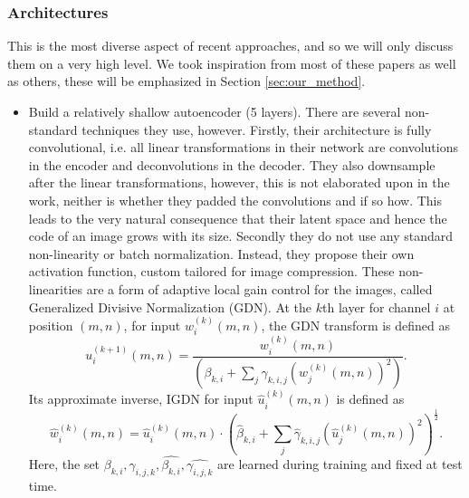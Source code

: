 \documentclass{article}
\begin{document}
\subsubsection{Architectures}
\par
This is the most diverse aspect of recent approaches, and so we will only
discuss them on a very high level. We took inspiration from most of these papers
as well as others, these will be emphasized in Section \ref{sec:our_method}.

\begin{itemize}
\item \cite{balle2016end} Build a relatively shallow autoencoder (5 layers).
  There are several non-standard techniques they use, however. Firstly, their
  architecture is fully convolutional, i.e. all linear transformations in their
  network are convolutions in the encoder and deconvolutions in the decoder.
  They also downsample after the linear transformations, however, this is not
  elaborated upon in the work, neither is whether they padded the convolutions
  and if so how.
  This leads to the very natural consequence that their latent space and hence
  the code of an image grows with its size. Secondly they do not use any
  standard non-linearity or batch normalization. Instead, they propose their own
  activation function, custom tailored for image compression. These
  non-linearities are a form of adaptive local gain control for the images,
  called Generalized Divisive Normalization (GDN). At the $k$th layer for
  channel $i$ at position $(m, n)$, for input $w_i^{(k)}(m, n)$, the GDN
  transform is defined as
  \begin{equation}
    \label{eq:gdn_def}
    u_i^{(k + 1)}(m, n) = \frac{w_i^{(k)}(m, n)}{
      \left( \beta_{k, i} + \sum_j \gamma_{k, i, j}
        \left( w_{j}^{(k)}(m, n)\right)^2 \right)}.
  \end{equation}
  Its approximate inverse, IGDN for input $\hat{u}_i^{(k)}(m, n)$ is defined as
  \begin{equation}
    \label{eq:igdn_def}
    \hat{w}_i^{(k)}(m, n) = \hat{u}_i^{(k)}(m, n) \cdot \left(
      \hat{\beta}_{k, i} + \sum_{j} \hat{\gamma}_{k, i, j} \left(
      \hat{u}_j^{(k)}(m, n)\right)^2 \right)^{\frac{1}{2}}.
  \end{equation}
  Here, the set $\beta_{k, i}, \gamma_{i, j, k}, \hat{\beta_{k, i}},
  \hat{\gamma_{i, j, k}}$ are learned during training and fixed at test time.
  

\end{itemize}
\end{document}
